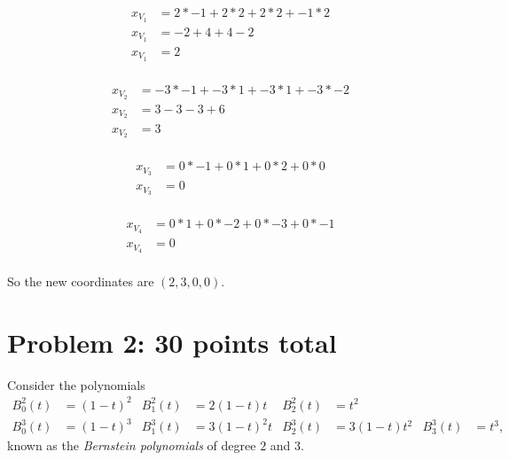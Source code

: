 \documentclass[12pt]{article}
\begin{document}
\begin{align*}
    x_{V_{1}} &= 2 * -1 + 2 * 2 + 2 * 2 + -1 * 2 \\
    x_{V_{1}} &= -2 + 4 + 4 - 2 \\
    x_{V_{1}} &= 2 \\
\end{align*}

\begin{align*}
    x_{V_{2}} &= -3 * -1 + -3 * 1 + -3 * 1 + -3 * -2 \\
    x_{V_{2}} &=  3 - 3 - 3 + 6\\
    x_{V_{2}} &= 3 \\
\end{align*}

\begin{align*}
    x_{V_{3}} &= 0 * -1 + 0 * 1 + 0 * 2 + 0 * 0 \\
    x_{V_{3}} &= 0 \\
\end{align*}

\begin{align*}
    x_{V_{4}} &= 0 * 1 + 0 * -2 + 0 * -3 + 0 * -1 \\
    x_{V_{4}} &= 0 \\
\end{align*}

So the new coordinates are $(2,3,0,0)$.




\section*{Problem 2: 30 points total}
\label{prob-3.3}
Consider the polynomials
\begin{align*}
B_0^2(t) & = (1 - t)^2  & B_1^2(t)  & = 2(1 - t)t & B_2^2(t) & = t^2 
&   &    \\
B_0^3(t) & = (1 - t)^3  & B_1^3(t) & = 3(1 - t)^2t & B_2^3(t) & = 3(1 - t)t^2 
 &  B_3^3(t) & = t^3,
\end{align*}
known as the {\it Bernstein polynomials\/} of degree $2$ and $3$.
\end{document}
